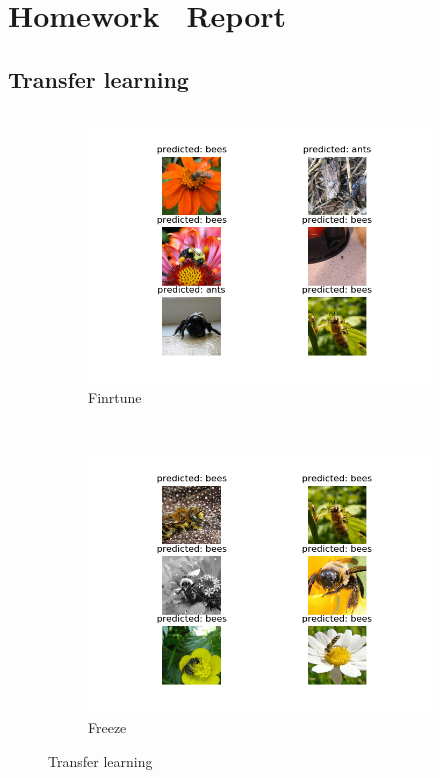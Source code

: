 \documentclass[12pt]{article}
\begin{document}
\section{Homework \thesection\ Report}
\subsection{Transfer learning}
\begin{scriptsize}
    \inputminted[frame=single,framesep=9pt,linenos, breaklines,xleftmargin=\parindent,xrightmargin=5pt]{python}{./Homework2/code/transfer_learning.py}
\end{scriptsize}
\begin{figure}[htbp]
    \centering
    \begin{subfigure}[t]{0.48\textwidth}
        \centering
        \includegraphics[trim={3in 0in 3in 0in},scale=0.8]{./Homework2/output/hw2p1_fig01.png}
        \caption{Finrtune}
    \label{hw2p1a}
    \end{subfigure}\\
    \begin{subfigure}[t]{0.48\textwidth}
        \centering
        \includegraphics[trim={3in 0in 3in 0in},scale=0.8]{./Homework2/output/hw2p1_fig02.png}
        \caption{Freeze}
    \label{hw2p1b}
    \end{subfigure}
    \caption{Transfer learning}
\end{figure}
\end{document}
